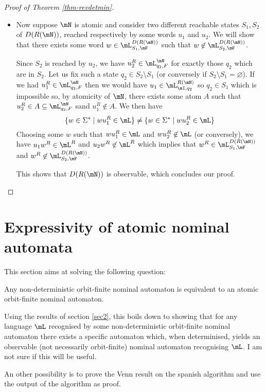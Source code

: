 \documentclass[a4paper, UKenglish, cleveref, autoref, numberwithinsect]{lipics-modified}
\begin{document}
\begin{proof}[Proof of Theorem \ref{thm-revdetmin}]
\begin{itemize}
\begin{itemize}
\end{itemize}

Hence $A=X$, so $X$ is an atom of $\mL$. Since every right language of $\mN$ is a union of partial atoms, it is a union of atoms so $\mN$ is atomic.

\item Now suppose $\mN$ is atomic and consider two different reachable states $S_1,S_2$ of $D(R(\mN))$, reached respectively by some words $u_1$ and $u_2$. We will show that there exists some word $w\in\mL_{S_1,\mF}^{D(R(\mN))}$ such that $w\not\in\mL_{S_2,\mF}^{D(R(\mN))}$.

Since $S_2$ is reached by $u_2$, we have $u_2^R\in\mL_{q_2,F}^\mN$ for exactly those $q_2$ which are in $S_2$. Let us fix such a state $q_2\in S_2\setminus S_1$ (or conversely if $S_2\setminus S_1=\varnothing$). If we had $u_1^R\in \mL_{q_2,F}^\mN$ then we would have $u_1\in\mL_{\mI,q_2}^{R(\mN)}$ so $q_2\in S_1$ which is impossible so, by atomicity of $\mN$, there exists some atom $A$ such that $u_2^R\in A\subseteq \mL_{q_2,F}^\mN$ sand $u_1^R\not\in A$. We then have $$\{w\in\Sigma^*\mid wu_1^R\in\mL\}\neq\{w\in\Sigma^*\mid wu_2^R\in\mL\}$$ Choosing some $w$ such that $wu_1^R\in\mL$ and $wu_2^R\not\in\mL$ (or conversely), we have $u_1w^R\in\mL^R$ and $u_2w^R\not\in\mL^R$ which implies that $w^R\in\mL_{S_1,\mF}^{D(R(\mN))}$ and $w^R\not\in\mL_{S_2,\mF}^{D(R(\mN))}$.

This shows that $D(R(\mN))$ is observable, which concludes our proof.

\end{itemize}

\end{proof}

\section{Expressivity of atomic nominal automata}

This section aims at solving the following question:

\begin{theorem}

Any non-deterministic orbit-finite nominal automaton is equivalent to an atomic orbit-finite nominal automaton.

\end{theorem}

Using the results of section \ref{sec2}, this boils down to showing that for any language $\mL$ recognised by some non-deterministic orbit-finite nominal automaton there exists a specific automaton which, when determinised, yields an observable (not necessarily orbit-finite) nominal automaton recognising $\mL$. I am not sure if this will be useful.

An other possibility is to prove the Venn result on the spanish algorithm and use the output of the algorithm as proof.


\end{document}
